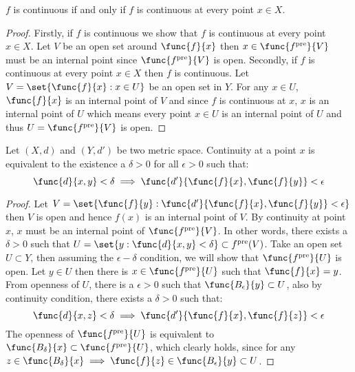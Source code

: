 \begin{proposition}
    \(f\) is continuous if and only if \(f\) is continuous at every point \(x \in X\).
\end{proposition}

\begin{proof}
    Firstly, if \(f\) is continuous we show that \(f\) is continuous at every point \(x \in X\). Let \(V\) be an open set around \( \func{f}{x}\) then \(x \in \func{f^{\mathrm{pre}}}{V}\) must be an internal point since \(\func{f^{\mathrm{pre}}}{V}\) is open.
    Secondly, if \(f\) is continuous at every point \(x \in X\) then \(f\) is continuous. Let \(V = \set{\func{f}{x} : x \in U}\) be an open set in \(Y\). For any \(x \in U\), \(\func{f}{x}\) is an internal point of \(V\) and since \(f\) is continuous at \(x\), \(x\) is an internal point of \(U\) which means every point \(x \in U\) is an internal point of \(U\) and thus \(U = \func{f^{\mathrm{pre}}}{V}\) is open.
\end{proof}

\begin{theorem} 
    Let \((X,d)\) and \((Y,d')\) be two metric space. Continuity at a point \(x\) is equivalent to the existence a \(\delta > 0\) for all \(\epsilon > 0\) such that:
    \[\func{d}{x,y} < \delta \implies \func{d'}{\func{f}{x},\func{f}{y}} < \epsilon \]
\end{theorem}

\begin{proof}
    Let \(V = \set{ \func{f}{y} :\func{d'}{\func{f}{x},\func{f}{y}} < \epsilon}\) then \(V\) is open and hence \(f(x)\) is an internal point of \(V\). By continuity at point \(x\), \(x\) must be an internal point of \(\func{f^{\mathrm{pre}}}{V}\). In other words, there exists a \(\delta > 0\) such that \(U = \set{ y : \func{d}{x,y} < \delta } \subset f^{\mathrm{pre}}(V)\).
    Take an open set \(U \subset Y\), then assuming the \(\epsilon-\delta\) condition, we will show that \(\func{f^{\mathrm{pre}}}{U}\) is open. Let \(y \in U\) then there is \(x \in \func{f^{\mathrm{pre}}}{U}\) such that \(\func{f}{x} = y\). From openness of \(U\), there is a \( \epsilon > 0\) such that \(\func{B_\epsilon}{y} \subset U\), also by continuity condition, there exists a \(\delta > 0 \) such that:
    \begin{equation*}
        \func{d}{x,z} < \delta \implies \func{d'}{\func{f}{x},\func{f}{z}} < \epsilon
    \end{equation*}
    The openness of \(\func{f^{\mathrm{pre}}}{U}\) is equivalent to \(\func{B_\delta}{x} \subset \func{f^{\mathrm{pre}}}{U}\), which clearly holds, since for any \(z \in \func{B_\delta}{x} \implies \func{f}{z} \in \func{B_\epsilon}{y} \subset U\).
\end{proof}

